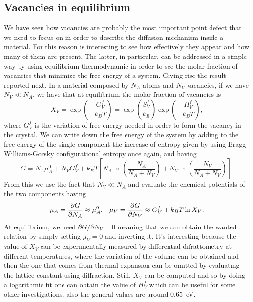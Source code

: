 \subsection{Vacancies in equilibrium}

We have seen how vacancies are probably the most important point defect that we need to focus on in order to describe the diffusion mechanism inside a material. For this reason is interesting to see how effectively they appear and how many of them are present. The latter, in particular, can be addressed in a simple way by using equilibrium thermodynamic in order to see the molar fraction of vacancies that minimize the free energy of a system. Giving rise the result reported next.
{
    In a material composed by $N_A$ atoms and $N_V$ vacancies, if we have $N_V \ll N_A$, we have that at equilibrium the molar fraction of vacancies is
    \begin{equation}
        X_V = \exp\left( -\frac{G_V^f}{k_BT} \right) = \exp\left( \frac{S_V^f}{k_B} \right)\exp\left( -\frac{H_V^f}{k_BT} \right),
    \end{equation} 
    where $G_V^f$ is the variation of free energy needed in order to form the vacancy in the crystal.
}
{
    We can write down the free energy of the system by adding to the free energy of the single component the increase of entropy given by using Bragg-Williams-Gorsky configurational entropy once again, and having
    \begin{equation}
        G = N_A\mu_A^0 + N_V G_V^f + k_BT\left[ N_A\ln\left( \frac{N_A}{N_A + N_V} \right) + N_V\ln\left( \frac{N_V}{N_A + N_V} \right) \right].
    \end{equation}
    From this we use the fact that $N_V \ll N_A$ and evaluate the chemical potentials of the two components having
    \begin{align}
        &\mu_A = \pdv{G}{N_A} \approx \mu_A^0, &\mu_V = \pdv{G}{N_V} \approx G_V^f + k_BT\ln X_V.
    \end{align}
    At equilibrium, we need $\partial G/\partial N_V = 0$ meaning that we can obtain the wanted relation by simply setting $\mu_V = 0$ and inverting it.
}
\noindent
It's interesting because the value of $X_V$ can be experimentally measured by differential difrattometry at different temperatures, where the variation of the volume can be obtained and then the one that comes from thermal expansion can be omitted by evaluating the lattice constant using diffraction. Still, $X_V$ can be computed and so by doing a logarithmic fit one can obtain the value of $H_V^f$ which can be useful for some other investigations, also the general values are around \SI{0.65}{\electronvolt}.

